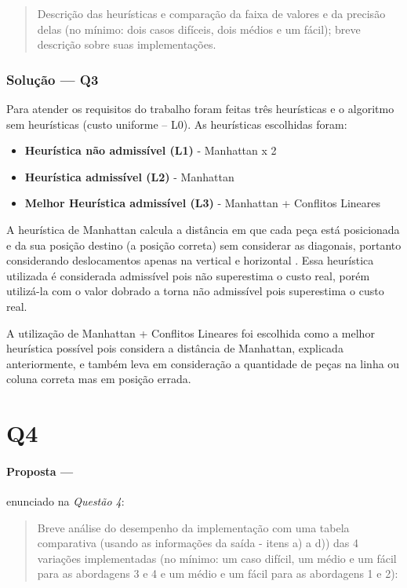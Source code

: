 \documentclass[12pt]{article}
\begin{document}
\begin{quote}
Descrição das heurísticas e comparação da faixa de valores e da precisão delas (no mínimo: dois casos difíceis, dois médios e um fácil); breve descrição sobre suas implementações.
\end{quote}

\subsubsection{Solução --- \textbf{Q3}}

Para atender os requisitos do trabalho foram feitas três heurísticas e o algoritmo sem heurísticas (custo uniforme – L0). As heurísticas escolhidas foram:

\begin{itemize}
    \item \textbf{Heurística não admissível (L1)} - Manhattan x 2
    \item \textbf{Heurística admissível (L2)} - Manhattan
    \item \textbf{Melhor Heurística admissível (L3)} - Manhattan + Conflitos Lineares
\end{itemize}

A heurística de Manhattan calcula a distância em que cada peça está posicionada e da sua posição destino (a posição correta) sem considerar as diagonais, portanto considerando deslocamentos apenas na vertical e horizontal \cite{sharma2016}. Essa heurística utilizada é considerada admissível pois não superestima o custo real, porém utilizá-la com o valor dobrado a torna não admissível pois superestima o custo real.

A utilização de Manhattan + Conflitos Lineares foi escolhida como a melhor heurística possível pois considera a distância de Manhattan, explicada anteriormente, e também leva em consideração a quantidade de peças na linha ou coluna correta mas em posição errada.

\section{Q4}

\paragraph{Proposta ---} enunciado na \textit{Questão 4}:

\begin{quote}
Breve análise do desempenho da implementação com uma tabela comparativa (usando as informações da saída - itens a) a d)) das 4 variações implementadas (no mínimo: um caso difícil, um médio e um fácil para as abordagens 3 e 4 e um médio e um fácil para as abordagens 1 e 2):
\end{quote}
\end{document}
